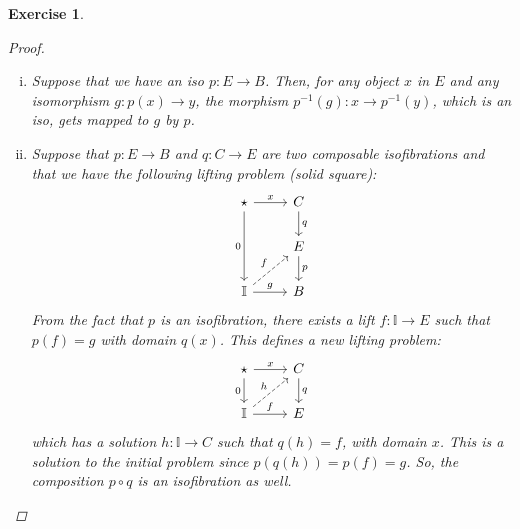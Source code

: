 \documentclass[10pt]{article}
\newtheorem{exercise}{Exercise}
\theoremstyle{definition}
\newcommand{\I}{\mathbb{I}}
\renewcommand{\comp}{\mathbin{\circ}}
\begin{document}
\begin{exercise}
\begin{proof}
\begin{enumerate}[i)]
 \item Suppose that we have an iso $p : E \to B$.
 Then, for any object $x$ in $E$ and any
 isomorphism $g : p(x) \to y$, the morphism
 $p^{-1}(g) : x \to p^{-1}(y)$, which is an
 iso, gets mapped to $g$ by $p$.
 
 \item Suppose that $p : E \to B$ and
 $q : C \to E$ are two composable isofibrations
 and that we have the following lifting problem
 (solid square):
 \[
  \begin{tikzcd}
   \star \rar["x"] \ar[dd, "0"'] & C \dar["q"] \\
    & E \dar["p"] \\
   \I \ar[ur, dashed, "f"] \rar["g"] & B
  \end{tikzcd}
 \]
 From the fact that $p$ is an isofibration,
 there exists a lift $f : \I \to E$ such
 that $p(f) = g$ with domain $q(x)$.
 This defines a new lifting problem:
 \[
  \begin{tikzcd}
   \star \rar["x"] \dar["0"'] & C \dar["q"] \\
   \I \rar["f"] \ar[ur, dashed, "h"] & E
  \end{tikzcd}
 \]
 which has a solution $h : \I \to C$ such that
 $q(h) = f$, with domain $x$. This is a solution
 to the initial problem since $p(q(h)) = p(f) = g$.
 So, the composition $p \comp q$ is an
 isofibration as well.
\end{enumerate}

\end{proof}

\end{exercise}
\end{document}
